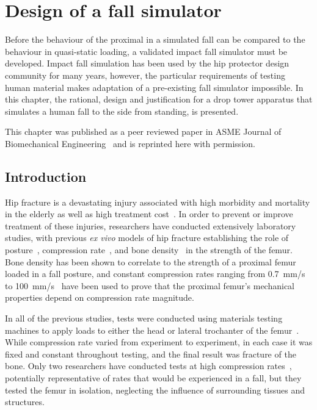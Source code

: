 
\chapter{Design of a fall simulator}
\label{ch:fall_sim_design}
Before the behaviour of the proximal in a simulated fall can be compared to the behaviour in quasi-static loading, a validated impact fall simulator must be developed.
Impact fall simulation has been used by the hip protector design community for many years, however, the particular requirements of testing human material makes adaptation of a pre-existing fall simulator impossible.
In this chapter, the rational, design and justification for a drop tower apparatus that simulates a human fall to the side from standing, is presented.

This chapter was published as a peer reviewed paper in ASME Journal of Biomechanical Engineering~\citep{gilchrist_development_2013} and is reprinted here with permission.

\section{Introduction}
\label{sec:fall_sim_design_intro}
Hip fracture is a devastating injury associated with high morbidity and mortality in the elderly as well as high treatment cost~\citep{braithwaite_estimating_2003, forsen_survival_1999,wiktorowicz_economic_2001}.
In order to prevent or improve treatment of these injuries, researchers have conducted extensively laboratory studies, with previous \textit{ex vivo} models of hip fracture establishing the role of posture~\citep{pinilla_impact_1996, ford_effect_1996}, compression rate~\citep{courtney_effects_1994, weber_proximal_1992}, and bone density~\citep{lotz_use_1990, lochmuller_mechanical_2002, manske_cortical_2008} in the strength of the femur.
Bone density has been shown to correlate to the strength of a proximal femur loaded in a fall posture, and constant compression rates ranging from 0.7~\ac{mm}/\ac{s}~ to 100~\ac{mm}/\ac{s}~\citep{courtney_effects_1994, weber_proximal_1992} have been used to prove that the proximal femur's mechanical properties depend on compression rate magnitude.

In all of the previous studies, tests were conducted using materials testing machines to apply loads to either the head or lateral trochanter of the femur~\citep{boehm_prediction_2008, courtney_effects_1994, de_bakker_during_2009, lochmuller_mechanical_2002, lotz_use_1990, manske_cortical_2008, roberts_comparison_2010, weber_proximal_1992, keyak_relationships_2000}.
While compression rate varied from experiment to experiment, in each case it was fixed and constant throughout testing, and the final result was fracture of the bone.
Only two researchers have conducted tests at high compression rates~\citep{weber_proximal_1992, backman_proximal_1957}, potentially representative of rates that would be experienced in a fall, but they tested the femur in isolation, neglecting the influence of surrounding tissues and structures.

